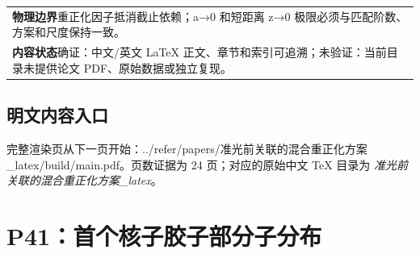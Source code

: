 \documentclass[UTF8,11pt,oneside]{ctexbook}
\begin{document}
\begin{table}[htbp]
\begin{tabular}{@{}p{}@{}}
    \textbf{物理边界}\quad 重正化因子抵消截止依赖；a→0 和短距离 z→0 极限必须与匹配阶数、方案和尺度保持一致。 \\
    \textbf{内容状态}\quad 确证：中文/英文 LaTeX 正文、章节和索引可追溯；未验证：当前目录未提供论文 PDF、原始数据或独立复现。 \\
    \bottomrule
  \end{tabular}
\end{table}
\section*{明文内容入口}
\noindent 完整渲染页从下一页开始：../\allowbreak{}refer/\allowbreak{}papers/\allowbreak{}准光前关联的混合重正化方案\_\allowbreak{}latex/\allowbreak{}build/\allowbreak{}main.pdf。页数证据为 24 页；对应的原始中文 TeX 目录为 \emph{准光前关联的混合重正化方案\_latex}。
\clearpage

\clearpage

\chapter{P41：首个核子胶子部分子分布}
\end{document}
